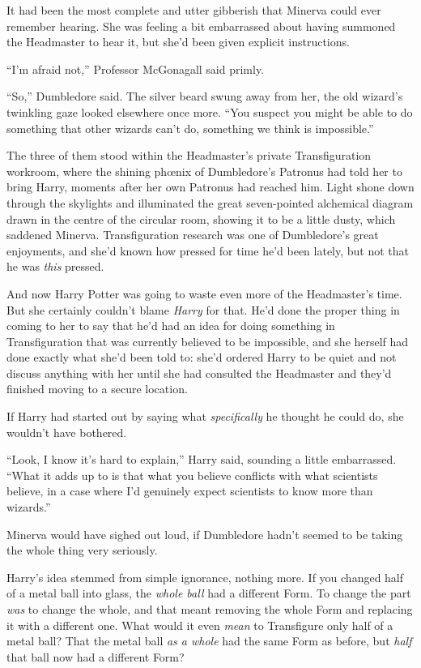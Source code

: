 It had been the most complete and utter gibberish that Minerva could ever remember hearing. She was feeling a bit embarrassed about having summoned the Headmaster to hear it, but she’d been given explicit instructions.

“I’m afraid not,” Professor McGonagall said primly.

“So,” Dumbledore said. The silver beard swung away from her, the old wizard’s twinkling gaze looked elsewhere once more. “You suspect you might be able to do something that other wizards can’t do, something we think is impossible.”

The three of them stood within the Headmaster’s private Transfiguration workroom, where the shining phœnix of Dumbledore’s Patronus had told her to bring Harry, moments after her own Patronus had reached him. Light shone down through the skylights and illuminated the great seven-pointed alchemical diagram drawn in the centre of the circular room, showing it to be a little dusty, which saddened Minerva. Transfiguration research was one of Dumbledore’s great enjoyments, and she’d known how pressed for time he’d been lately, but not that he was \emph{this} pressed.

And now Harry Potter was going to waste even more of the Headmaster’s time. But she certainly couldn’t blame \emph{Harry} for that. He’d done the proper thing in coming to her to say that he’d had an idea for doing something in Transfiguration that was currently believed to be impossible, and she herself had done exactly what she’d been told to: she’d ordered Harry to be quiet and not discuss anything with her until she had consulted the Headmaster and they’d finished moving to a secure location.

If Harry had started out by saying what \emph{specifically} he thought he could do, she wouldn’t have bothered.

“Look, I know it’s hard to explain,” Harry said, sounding a little embarrassed. “What it adds up to is that what you believe conflicts with what scientists believe, in a case where I’d genuinely expect scientists to know more than wizards.”

Minerva would have sighed out loud, if Dumbledore hadn’t seemed to be taking the whole thing very seriously.

Harry’s idea stemmed from simple ignorance, nothing more. If you changed half of a metal ball into glass, the \emph{whole ball} had a different Form. To change the part \emph{was} to change the whole, and that meant removing the whole Form and replacing it with a different one. What would it even \emph{mean} to Transfigure only half of a metal ball? That the metal ball \emph{as a whole} had the same Form as before, but \emph{half} that ball now had a different Form?

